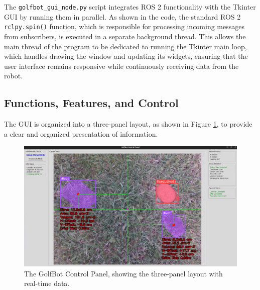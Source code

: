 The \texttt{golfbot\_gui\_node.py} script integrates ROS 2 functionality with the Tkinter GUI by running them in parallel. As shown in the code, the standard ROS 2 \texttt{rclpy.spin()} function, which is responsible for processing incoming messages from subscribers, is executed in a separate background thread. This allows the main thread of the program to be dedicated to running the Tkinter main loop, which handles drawing the window and updating its widgets, ensuring that the user interface remains responsive while continuously receiving data from the robot.

\subsection{Functions, Features, and Control}
\label{ssec:gui_features}
The GUI is organized into a three-panel layout, as shown in Figure \ref{fig:golfbot_gui}, to provide a clear and organized presentation of information.

\begin{figure}[h!]
    \centering
    \includegraphics[width=\linewidth]{figures/GUI.PNG}
    \caption{The GolfBot Control Panel, showing the three-panel layout with real-time data.}
    \label{fig:golfbot_gui}
\end{figure}

